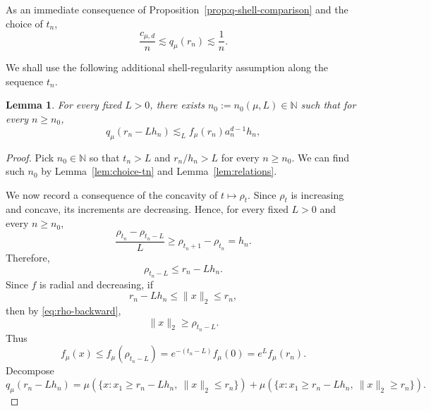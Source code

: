 \documentclass[10pt]{amsart}
\newcommand{\1}{\textbf{1}}
\numberwithin{equation}{section} %
\newtheorem{lemma}[theorem]{Lemma}
\theoremstyle{remark}
\theoremstyle{definition}
\begin{document}
As an immediate consequence of Proposition~\ref{prop:q-shell-comparison} and the choice of \(t_n\),
\begin{equation}\label{eq:q-one-over-n}
\frac{c_{\mu,d}}{n} \lesssim q_\mu(r_n)\lesssim \frac1n.
\end{equation}

We shall use the following additional shell-regularity assumption along the sequence \(t_n\).

\begin{lemma}\label{lem:inward-q}
For every fixed \(L>0\), there exists $n_0:=n_0(\mu,L) \in \mathbb{N}$ such that for every $n \geq n_0$,
\[
q_\mu(r_n-Lh_n)\lesssim_L f_\mu(r_n)a_n^{d-1}h_n
,\]

\end{lemma}


\begin{proof}
Pick $n_0 \in \mathbb{N}$ so that $t_{n}>L$ and $r_n/h_n>L$ for every $n \geq n_0$. We can find such $n_0$ by Lemma~\ref{lem:choice-tn} and Lemma~\ref{lem:relations}.

We now record a consequence of the concavity of \(t\mapsto\rho_t\). Since \(\rho_t\) is increasing and concave, its increments are decreasing. Hence, for every fixed \(L> 0\) and every $n \geq n_0$,
\[
\frac{\rho_{t_n}-\rho_{t_n-L}}{L}
\ge
\rho_{t_n+1}-\rho_{t_n}
=
h_n.
\]
Therefore,
\begin{equation}\label{eq:rho-backward}
\rho_{t_n-L}\le r_n-Lh_n.
\end{equation}
Since \(f\) is radial and decreasing, if
\[
r_n-Lh_n\le \|x\|_2\le r_n,
\]
then by \eqref{eq:rho-backward},
\[
\|x\|_2\ge \rho_{t_n-L}.
\]
Thus
\begin{equation}\label{eq:density-inner-control}
f_\mu(x)\le f_\mu(\rho_{t_n-L})
=
e^{-(t_n-L)}f_\mu(0)
=
e^L f_\mu(r_n).
\end{equation}
Decompose
\[
q_\mu(r_n-Lh_n)
=
\mu(\{x:x_1\ge r_n-Lh_n,\ \|x\|_2\le r_n\})
+
\mu(\{x:x_1\ge r_n-Lh_n,\ \|x\|_2\ge r_n\}).
\]


\end{proof}
\end{document}
